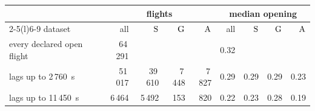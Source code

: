\begin{tabular}{@{}l r r r r r r r r@{}}
\toprule
 & \multicolumn{4}{c}{flights} & \multicolumn{4}{c}{median opening} \\
\cmidrule(lr){2-5}\cmidrule(l){6-9}
dataset & all & $\mathrm{S}$ & $\mathrm{G}$ & $\mathrm{A}$ & all & $\mathrm{S}$ & $\mathrm{G}$ & $\mathrm{A}$ \\
\midrule
every declared open flight & 64\,291 &  &  &  & 0.32 &  &  &  \\
lags up to 2\,760~s & 51\,017 & 39\,610 & 7\,448 & 7\,827 & 0.29 & 0.29 & 0.29 & 0.23 \\
lags up to 11\,450~s & 6\,464 & 5\,492 & 153 & 820 & 0.22 & 0.23 & 0.28 & 0.19 \\
\bottomrule
\end{tabular}
